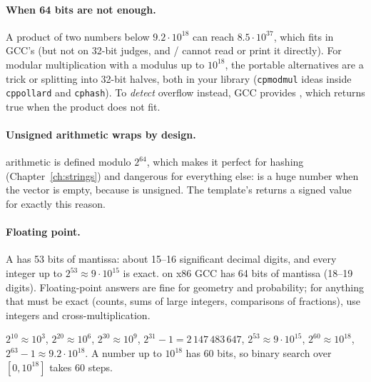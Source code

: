 \paragraph{When 64 bits are not enough.} A product of two numbers below $9.2 \cdot 10^{18}$ can reach $8.5 \cdot 10^{37}$,
which fits in GCC's  (but not on 32-bit judges, and / cannot read or print it directly). For
modular multiplication with a modulus up to $10^{18}$, the portable alternatives are a  trick or splitting
into 32-bit halves, both in your library (\texttt{cpmodmul} ideas inside \texttt{cppollard} and \texttt{cphash}). To
\emph{detect} overflow instead, GCC provides , which returns true when the product
does not fit.

\paragraph{Unsigned arithmetic wraps by design.}  arithmetic is defined modulo $2^{64}$, which makes
it perfect for hashing (Chapter~\ref{ch:strings}) and dangerous for everything else:  is a huge number when
the vector is empty, because  is unsigned. The template's  returns a signed value for exactly this
reason.

\paragraph{Floating point.} A  has 53 bits of mantissa: about 15--16 significant decimal digits, and every
integer up to $2^{53} \approx 9 \cdot 10^{15}$ is exact.  on x86 GCC has 64 bits of mantissa (18--19 digits).
Floating-point answers are fine for geometry and probability; for anything that must be exact (counts, sums of large
integers, comparisons of fractions), use integers and cross-multiplication.

\begin{fact}
$2^{10} \approx 10^3$, $2^{20} \approx 10^6$, $2^{30} \approx 10^9$, $2^{31} - 1 = 2\,147\,483\,647$, $2^{53} \approx 9 \cdot
10^{15}$, $2^{60} \approx 10^{18}$, $2^{63} - 1 \approx 9.2\cdot10^{18}$. A number up to $10^{18}$ has 60 bits, so binary
search over $[0, 10^{18}]$ takes 60 steps.
\end{fact}


